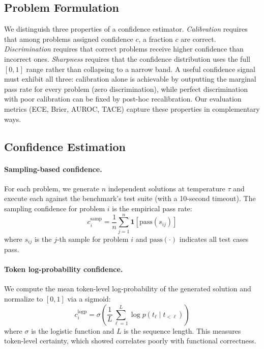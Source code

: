 \documentclass{article}
\begin{document}
\subsection{Problem Formulation}
\label{sec:formulation}

We distinguish three properties of a confidence estimator. \emph{Calibration} requires that among problems assigned confidence $c$, a fraction $c$ are correct. \emph{Discrimination} requires that correct problems receive higher confidence than incorrect ones. \emph{Sharpness} requires that the confidence distribution uses the full $[0,1]$ range rather than collapsing to a narrow band. A useful confidence signal must exhibit all three: calibration alone is achievable by outputting the marginal pass rate for every problem (zero discrimination), while perfect discrimination with poor calibration can be fixed by post-hoc recalibration. Our evaluation metrics (ECE, Brier, AUROC, TACE) capture these properties in complementary ways.

\subsection{Confidence Estimation}
\label{sec:confidence}

\paragraph{Sampling-based confidence.}
For each problem, we generate $n$ independent solutions at temperature $\tau$ and execute each against the benchmark's test suite (with a 10-second timeout). The sampling confidence for problem $i$ is the empirical pass rate:
\begin{equation}
  c_i^{\text{samp}} = \frac{1}{n}\sum_{j=1}^{n} \mathbf{1}[\text{pass}(s_{ij})]
  \label{eq:sampling}
\end{equation}
where $s_{ij}$ is the $j$-th sample for problem $i$ and $\text{pass}(\cdot)$ indicates all test cases pass.

\paragraph{Token log-probability confidence.}
We compute the mean token-level log-probability of the generated solution and normalize to $[0,1]$ via a sigmoid:
\begin{equation}
  c_i^{\text{logp}} = \sigma\!\left(\frac{1}{L}\sum_{\ell=1}^{L} \log p(t_\ell \mid t_{<\ell})\right)
  \label{eq:logprob}
\end{equation}
where $\sigma$ is the logistic function and $L$ is the sequence length. This measures token-level certainty, which \citet{spiess2025calibration} showed correlates poorly with functional correctness.
\end{document}
